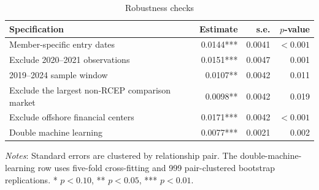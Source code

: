 \begin{table}[H]
\centering
\caption{Robustness checks}
\label{tab:robustness}
\scriptsize
\begin{threeparttable}
\begin{tabular*}{\textwidth}{@{\extracolsep{\fill}}lrrr}
\toprule
Specification & Estimate & s.e. & $p$-value \\
\midrule
Member-specific entry dates & 0.0144*** & 0.0041 & $<0.001$ \\
Exclude 2020--2021 observations & 0.0151*** & 0.0047 & 0.001 \\
2019--2024 sample window & 0.0107** & 0.0042 & 0.011 \\
Exclude the largest non-RCEP comparison market & 0.0098** & 0.0042 & 0.019 \\
Exclude offshore financial centers & 0.0171*** & 0.0042 & $<0.001$ \\
Double machine learning & 0.0077*** & 0.0021 & 0.002 \\
\bottomrule
\end{tabular*}
\begin{tablenotes}[flushleft]
\item
\footnotesize \textit{Notes}: Standard errors are clustered by relationship pair. The double-machine-learning row uses five-fold cross-fitting and 999 pair-clustered bootstrap replications. * $p<0.10$, ** $p<0.05$, *** $p<0.01$.
\end{tablenotes}
\end{threeparttable}
\end{table}
